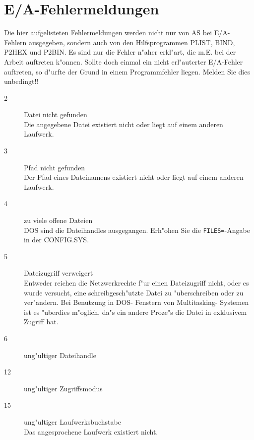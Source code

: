 \documentclass[12pt,a4paper,twoside]{report}
\newcommand{\tty}[1]{{\tt #1}}
\newcommand{\asname}{AS}
\begin{document}

\cleardoublepage
\chapter{E/A-Fehlermeldungen}

Die hier aufgelisteten Fehlermeldungen werden nicht nur von \asname{} bei E/A-
Fehlern ausgegeben, sondern auch von den Hilfsprogrammen PLIST, BIND,
P2HEX und P2BIN.  Es sind nur die Fehler n"aher erkl"art, die m.E. bei
der Arbeit auftreten k"onnen.  Sollte doch einmal ein nicht erl"auterter
E/A-Fehler auftreten, so d"urfte der Grund in einem Programmfehler
liegen.  Melden Sie dies unbedingt!!

\begin{description}
\item[2]{Datei nicht gefunden\\
         Die angegebene Datei existiert nicht oder liegt auf einem
         anderen Laufwerk.}

\item[3]{Pfad nicht gefunden\\
         Der Pfad eines Dateinamens existiert nicht oder liegt auf
         einem anderen Laufwerk.}

\item[4]{zu viele offene Dateien\\
         DOS sind die Dateihandles ausgegangen.  Erh"ohen Sie die
         \tty{FILES=}-Angabe in der CONFIG.SYS.}

\item[5]{Dateizugriff verweigert\\
         Entweder reichen die Netzwerkrechte f"ur einen Dateizugriff
         nicht, oder es wur\-de ver\-sucht, ei\-ne schreib\-ge\-sch"utz\-te Da\-tei
         zu "uber\-schrei\-ben oder zu ver\-"an\-dern.  Bei Benutzung in
         DOS- Fenstern von Multitasking- Systemen ist es "uberdies m"oglich,
         da"s ein andere Proze"s die Datei in exklusivem Zugriff hat.}

\item[6]{ung"ultiger Dateihandle}

\item[12]{ung"ultiger Zugriffsmodus}

\item[15]{ung"ultiger Laufwerksbuchstabe\\
          Das angesprochene Laufwerk existiert nicht.}



\end{description}
\end{document}
